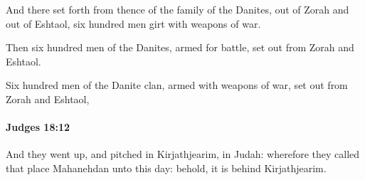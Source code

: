 			\begin{versebox}
					\item[BHS] 
					\item[ASV] And there set forth from thence of the family of the Danites, out of Zorah and out of Eshtaol, six hundred men girt with weapons of war.
					\item[NIV] Then six hundred men of the Danites, armed for battle, set out from Zorah and Eshtaol.
					\item[NRSV] Six hundred men of the Danite clan, armed with weapons of war, set out from Zorah and Eshtaol,
			\end{versebox}

		\paragraph{Judges 18:12} %
			\label{JUDGES-18-12}

			And they went up, and pitched in Kirjathjearim, in Judah: wherefore they called that place Mahanehdan unto this day: behold, it is behind Kirjathjearim.

